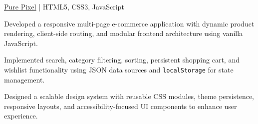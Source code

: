\begin{cvproject}{\href{https://github.com/grvsnh/PurePixel}{Pure Pixel} | HTML5, CSS3, JavaScript}{}
    \item Developed a responsive multi-page e-commerce application with dynamic product rendering, client-side routing, and modular frontend architecture using vanilla JavaScript.
    \item Implemented search, category filtering, sorting, persistent shopping cart, and wishlist functionality using JSON data sources and \texttt{localStorage} for state management.
    \item Designed a scalable design system with reusable CSS modules, theme persistence, responsive layouts, and accessibility-focused UI components to enhance user experience.
\end{cvproject}